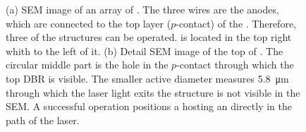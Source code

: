 	\begin{figure}[htp]
		\begin{subfigure}[t]{ 0.49\linewidth}
			\centering
			\caption{}
			\label{subfig::vcsel_sem_big_overview}
		\end{subfigure}
		\hfill
		\begin{subfigure}[t]{ 0.49\linewidth}
			\centering
			\caption{}
			\label{subfig::vcsel_sem_detail}
		\end{subfigure}
		\caption[SEM image of an array of \VCSELs]{(a) SEM image of an array of \VCSELs. The three wires are the anodes, which are connected to the top layer ($p$-contact) of the \VCSEL. Therefore, three of the \VCSEL structures can be operated. \BmFour is located in the top right whith \BmTwo to the left of it. (b) Detail SEM image of the top of \BmFour. The circular middle part is the hole in the $p$-contact through which the top DBR is visible. The smaller active diameter measures \SI{5.8}{\micro\meter} through which the laser light exits the structure is not visible in the SEM. A successful \pp operation positions a \nd hosting an \siv directly in the path of the \VCSELs laser.}
	\end{figure}

